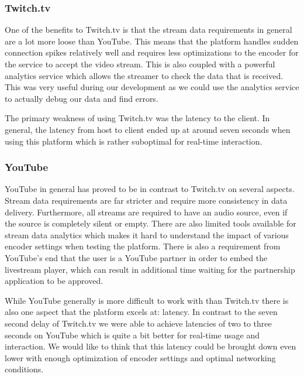 \subsubsection{Twitch.tv}
One of the benefits to Twitch.tv is that the stream data requirements in general are a lot more loose than YouTube. This means that the platform handles sudden connection spikes relatively well and requires less optimizations to the encoder for the service to accept the video stream. This is also coupled with a powerful analytics service which allows the streamer to check the data that is received. This was very useful during our development as we could use the analytics service to actually debug our data and find errors.

The primary weakness of using Twitch.tv was the latency to the client. In general, the latency from host to client ended up at around seven seconds when using this platform which is rather suboptimal for real-time interaction. 

\subsubsection{YouTube}
YouTube in general has proved to be in contrast to Twitch.tv on several aspects. Stream data requirements are far stricter and require more consistency in data delivery. Furthermore, all streams are required to have an audio source, even if the source is completely silent or empty. There are also limited tools available for stream data analytics which makes it hard to understand the impact of various encoder settings when testing the platform. There is also a requirement from YouTube's end that the user is a YouTube partner in order to embed the livestream player, which can result in additional time waiting for the partnership application to be approved. 

While YouTube generally is more difficult to work with than Twitch.tv there is also one aspect that the platform excels at: latency. In contrast to the seven second delay of Twitch.tv we were able to achieve latencies of two to three seconds on YouTube which is quite a bit better for real-time usage and interaction. We would like to think that this latency could be brought down even lower with enough optimization of encoder settings and optimal networking conditions.   

